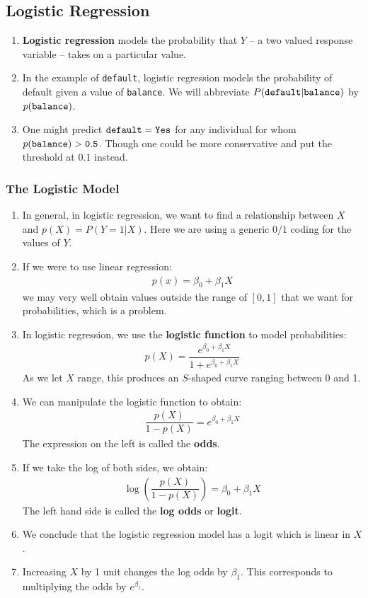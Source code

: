 \documentclass[10pt]{article}
\begin{document}
\subsection{Logistic Regression} 
\begin{enumerate}
	\item \textbf{Logistic regression} models the probability that $Y$ -- a two valued response variable -- takes on a particular value.
	\item In the example of {\tt default}, logistic regression models the probability of default given a value of {\tt balance}.  We will abbreviate $P(\tt default | \tt balance)$ by $p(\tt balance)$.
	\item One might predict $\tt default = \tt Yes$ for any individual for whom $p(\tt balance) > 0.5$.  Though one could be more conservative and put the threshold at $0.1$ instead.
\end{enumerate}
\subsubsection{The Logistic Model} 
\begin{enumerate}
	\item In general, in logistic regression, we want to find a relationship between $X$ and $p(X) = P(Y = 1| X)$.  Here we are using a generic $0/1$ coding for the values of $Y$.
	\item If we were to use linear regression:
	\begin{align*}
		p(x) = \beta_0 + \beta_1 X
	\end{align*}
	we may very well obtain values outside the range of $[0,1]$ that we want for probabilities, which is a problem.
	\item In logistic regression, we use the \textbf{logistic function} to model probabilities:
	\begin{align*}
		p(X) = \dfrac{e^{\beta_0 + \beta_1 X}}{1 + e^{\beta_0 + \beta_1 X}}
	\end{align*}
	As we let $X$ range, this produces an $S$-shaped curve ranging between 0 and 1.
	\item We can manipulate the logistic function to obtain:
	\begin{align*}
		\dfrac{p(X)}{1 - p(X)} = e^{\beta_0 + \beta_1 X }
	\end{align*}
	The expression on the left is called the \textbf{odds}.
	\item If we take the log of both sides, we obtain:
	\begin{align*}
		\log\left(\dfrac{p(X)}{1 - p(X)}\right) = \beta_0 + \beta_1X 
	\end{align*}
	The left hand side is called the \textbf{log odds} or \textbf{logit}.  
	\item We conclude that the logistic regression model has a logit which is linear in $X$.
	\item Increasing $X$ by 1 unit changes the log odds by $\beta_1$.  This corresponds to multiplying the odds by $e^{\beta_1}$.  
\end{enumerate}
\end{document}

